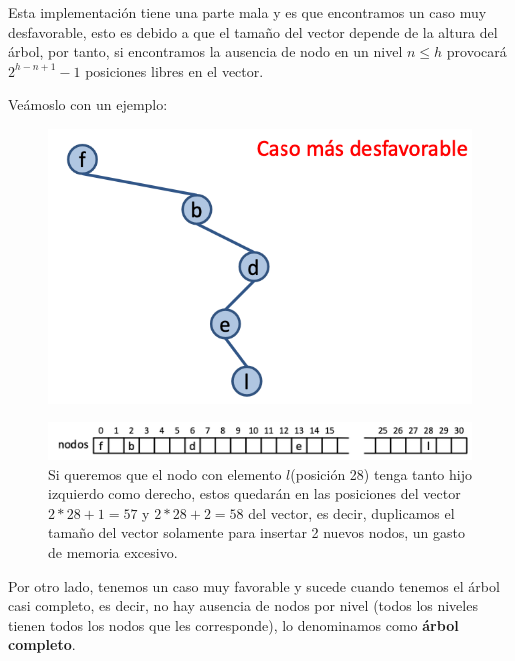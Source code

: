 Esta implementación tiene una parte mala y es que encontramos un caso muy desfavorable, esto es debido a que el tamaño del vector depende de la altura del árbol, por tanto, si encontramos la ausencia de nodo en un nivel \(n \leq h\) provocará \(2^{h-n+1}-1\) posiciones libres en el vector.

Veámoslo con un ejemplo:
\begin{figure}[h]
  \begin{minipage}{0.39\textwidth}
    \includegraphics[width=\textwidth]{assets/IVPR3.png}
  \end{minipage}
  \hfill
  \begin{minipage}{0.6\textwidth}
    \includegraphics*[width=\textwidth]{assets/IVPR4.png}
    Si queremos que el nodo con elemento \(l\)(posición 28) tenga tanto hijo izquierdo como derecho, estos quedarán en las posiciones del vector \(2*28+1 = 57\) y \(2*28+2 = 58\) del vector, es decir, duplicamos el tamaño del vector solamente para insertar 2 nuevos nodos, un gasto de memoria excesivo.
  \end{minipage}
\end{figure}
\newpage
Por otro lado, tenemos un caso muy favorable y sucede cuando tenemos el árbol casi completo, es decir, no hay ausencia de nodos por nivel (todos los niveles tienen todos los nodos que les corresponde), lo denominamos como \textbf{árbol completo}.

